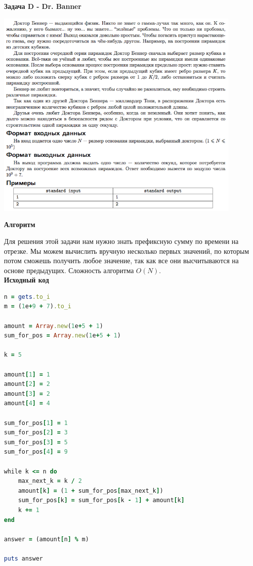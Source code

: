 \documentclass[a4paper,12pt]{article}
\begin{document}
\newpage
\textbf{{\large Задача D - Dr. Banner}}

\begin{center}
\includegraphics[width=0.9\textwidth]{OC_YKB/D.png}\\ [1cm]
\end{center}

\textbf{{\large Алгоритм}}

Для решения этой задачи нам нужно знать префиксную сумму по времени на отрезке. Мы можем вычислить вручную несколько первых значений, по которым потом сможешь получить любое значение, так как все они высчитываются на основе предыдущих. Сложность алгоритма $O(N)$. \\

\textbf{{\large Исходный код}} \\
\begin{lstlisting}[language=Ruby]
n = gets.to_i
m = (1e+9 + 7).to_i

amount = Array.new(1e+5 + 1)
sum_for_pos = Array.new(1e+5 + 1)

k = 5

amount[1] = 1
amount[2] = 2
amount[3] = 2
amount[4] = 4

sum_for_pos[1] = 1
sum_for_pos[2] = 3
sum_for_pos[3] = 5
sum_for_pos[4] = 9

while k <= n do
    max_next_k = k / 2
    amount[k] = (1 + sum_for_pos[max_next_k])
    sum_for_pos[k] = sum_for_pos[k - 1] + amount[k]
    k += 1
end

answer = (amount[n] % m)

puts answer
\end{lstlisting}
\end{document}
